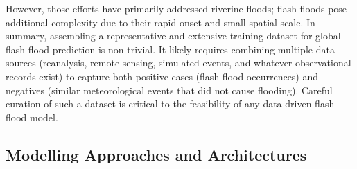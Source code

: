 However, those efforts have primarily addressed riverine floods; flash floods pose additional complexity due to their rapid onset and small spatial scale. In summary, assembling a representative and extensive training dataset for global flash flood prediction is non-trivial. It likely requires combining multiple data sources (reanalysis, remote sensing, simulated events, and whatever observational records exist) to capture both positive cases (flash flood occurrences) and negatives (similar meteorological events that did not cause flooding). Careful curation of such a dataset is critical to the feasibility of any data-driven flash flood model. 

\subsection{Modelling Approaches and Architectures} 
